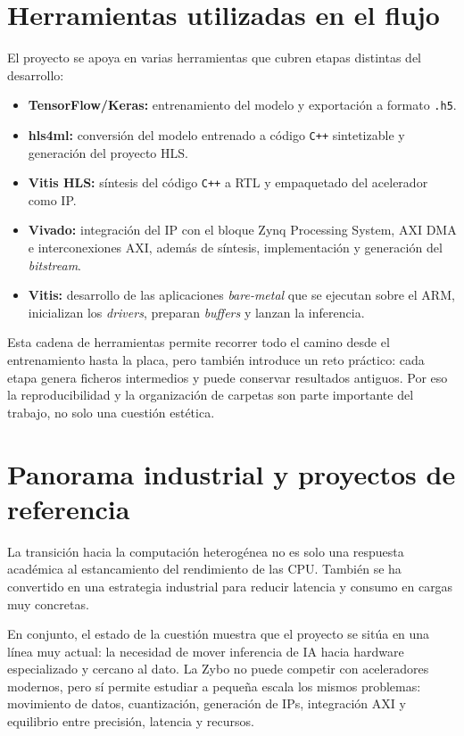 \section{Herramientas utilizadas en el flujo}
El proyecto se apoya en varias herramientas que cubren etapas distintas del desarrollo:

\begin{itemize}
  \item \textbf{TensorFlow/Keras:} entrenamiento del modelo y exportación a formato \texttt{.h5}.
  \item \textbf{hls4ml:} conversión del modelo entrenado a código \texttt{C++}
    sintetizable y generación del
    proyecto \ac{HLS}.
  \item \textbf{Vitis \ac{HLS}:} síntesis del código \texttt{C++} a \ac{RTL} y
    empaquetado del acelerador como \ac{IP}.
  \item \textbf{Vivado:} integración del \ac{IP} con el bloque Zynq Processing System,
    \ac{AXI} \ac{DMA} e interconexiones
    \ac{AXI}, además de síntesis, implementación y generación del \textit{bitstream}.
  \item \textbf{Vitis:} desarrollo de las aplicaciones \textit{bare-metal} que se
    ejecutan sobre el \ac{ARM},
    inicializan los \textit{drivers}, preparan \textit{buffers} y lanzan la inferencia.
\end{itemize}

Esta cadena de herramientas permite recorrer todo el camino desde el entrenamiento hasta la placa,
pero también introduce un reto práctico: cada etapa genera ficheros intermedios y puede conservar
resultados antiguos. Por eso la reproducibilidad y la organización de carpetas son parte importante
del trabajo, no solo una cuestión estética.

\section{Panorama industrial y proyectos de referencia}
La transición hacia la computación heterogénea no es solo una respuesta académica al estancamiento
del rendimiento de las \ac{CPU}. También se ha convertido en una estrategia industrial para reducir
latencia y consumo en cargas muy concretas.

En conjunto, el estado de la cuestión muestra que el proyecto se sitúa en una línea muy actual: la
necesidad de mover inferencia de \ac{IA} hacia hardware especializado y cercano al dato.
La Zybo no puede
competir con aceleradores modernos, pero sí permite estudiar a pequeña escala los mismos problemas:
movimiento de datos, cuantización, generación de IPs, integración \ac{AXI} y equilibrio
entre precisión,
latencia y recursos.

